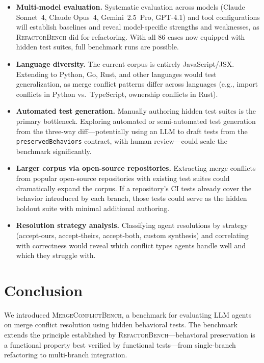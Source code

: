 \documentclass[11pt,a4paper]{article}
\begin{document}
\begin{itemize}[leftmargin=2em]
\item \textbf{Multi-model evaluation.} Systematic evaluation across models (Claude Sonnet~4, Claude Opus~4, Gemini~2.5~Pro, GPT-4.1) and tool configurations will establish baselines and reveal model-specific strengths and weaknesses, as \textsc{RefactorBench} did for refactoring. With all 86 cases now equipped with hidden test suites, full benchmark runs are possible.

\item \textbf{Language diversity.} The current corpus is entirely JavaScript/JSX. Extending to Python, Go, Rust, and other languages would test generalization, as merge conflict patterns differ across languages (e.g., import conflicts in Python vs.\ TypeScript, ownership conflicts in Rust).

\item \textbf{Automated test generation.} Manually authoring hidden test suites is the primary bottleneck. Exploring automated or semi-automated test generation from the three-way diff---potentially using an LLM to draft tests from the \texttt{preservedBehaviors} contract, with human review---could scale the benchmark significantly.

\item \textbf{Larger corpus via open-source repositories.} Extracting merge conflicts from popular open-source repositories with existing test suites could dramatically expand the corpus. If a repository's CI tests already cover the behavior introduced by each branch, those tests could serve as the hidden holdout suite with minimal additional authoring.

\item \textbf{Resolution strategy analysis.} Classifying agent resolutions by strategy (accept-ours, accept-theirs, accept-both, custom synthesis) and correlating with correctness would reveal which conflict types agents handle well and which they struggle with.
\end{itemize}

\section{Conclusion}
\label{sec:conclusion}

We introduced \textsc{MergeConflictBench}, a benchmark for evaluating LLM agents on merge conflict resolution using hidden behavioral tests. The benchmark extends the principle established by \textsc{RefactorBench}---behavioral preservation is a functional property best verified by functional tests---from single-branch refactoring to multi-branch integration.
\end{document}
